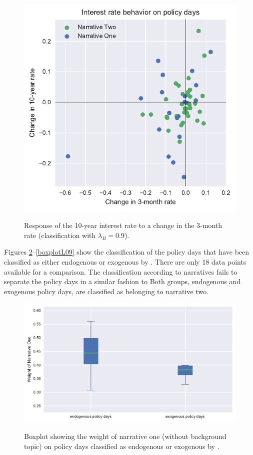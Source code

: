 \documentclass[11pt,a4paper,english,oneside]{book}
\numberwithin{equation}{chapter}
\begin{document}
\begin{figure}
	\caption{Response of the 10-year interest rate to a change in the 3-month rate (classification with $\lambda_B=0.9$).}
	\centering
	\includegraphics[scale=1]{Images/ChangePlot_L0_9.pdf}
	\label{Change02_L09}
\end{figure}


Figures \ref{boxplotL00}--\ref{boxplotL09} show the classification of the policy days that have been classified as either endogenous or exogenous by \citet[p. 11]{Ellingsen.2003}. There are only 18 data points available for a comparison. The classification according to narratives fails to separate the policy days in a similar fashion to \citeauthor{Ellingsen.2003} Both groups, endogenous and exogenous policy days, are classified as belonging to narrative two. 


\begin{figure}
	\caption{Boxplot showing the weight of narrative one (without background topic) on policy days classified as endogenous or exogenous by \citet[p. 11]{Ellingsen.2003}.}
	\centering
	\includegraphics[scale=1]{Images/boxplot_Lamb_0_0.pdf}
	\label{boxplotL00}
\end{figure}
\end{document}
